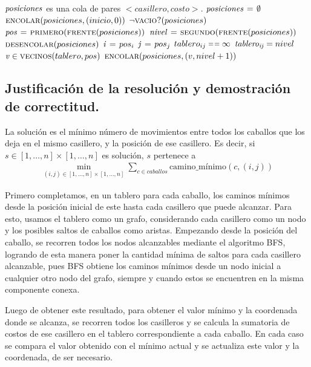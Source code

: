 \begin{codebox}
\li \Comment $\id{posiciones}$ es una cola de pares $<casillero, costo>$.
\li $\id{posiciones} \gets \emptyset$
\li $\textnormal{\scshape encolar}(posiciones, (inicio, 0))$
\li \While $\lnot \textnormal{\scshape vacio?}(posiciones)$ \Do
\li   $\id{pos} \gets \proc{primero}(\proc{frente}(posiciones))$
\li   $\id{nivel} \gets \proc{segundo}(\proc{frente}(posiciones))$
\li   $\textnormal{\scshape desencolar}(posiciones)$
\li   $\id{i} \gets pos_i$
\li   $\id{j} \gets pos_j$
\li   \If $tablero_{ij} \isequal \infty$ \Then
\li     $\id{tablero_{ij}} = nivel$
\li     \For $\id{v} \in \proc{vecinos}(tablero, pos)$ \Do
\li       $\textnormal{\scshape encolar}(posiciones, (v, nivel + 1))$
        \End
      \End
    \End	
\end{codebox}

\newpage
\subsection{Justificación de la resolución y demostración de correctitud.}

\vspace*{0.3cm}

La solución es el mínimo número de movimientos entre todos los caballos que
los deja en el mismo casillero, y la posición de ese casillero. Es decir, si
$s \in [1, \dots, n] \times [1, \dots, n]$ es solución, $s$ pertenece a
\begin{align*}
\min_{(i, j) \in [1, \dots, n] \times [1, \dots, n]} \sum_{c \in caballos}
\text{camino\_mínimo}(c, (i, j))
\end{align*}

Primero completamos, en un tablero para cada caballo, los caminos mínimos
desde la posición inicial de este hasta cada casillero que puede alcanzar.
Para esto, usamos el tablero como un grafo, considerando cada casillero como
un nodo y los posibles saltos de caballos como aristas. Empezando desde la
posición del caballo, se recorren todos los nodos alcanzables mediante el
algoritmo BFS, logrando de esta manera poner la cantidad mínima de saltos
para cada casillero alcanzable, pues BFS obtiene los caminos mínimos desde
un nodo inicial a cualquier otro nodo del grafo, siempre y cuando estos se
encuentren en la misma componente conexa.

Luego de obtener este resultado, para obtener el valor mínimo y la
coordenada donde se alcanza, se recorren todos los casilleros y se calcula
la sumatoria de costos de ese casillero en el tablero correspondiente a cada
caballo. En cada caso se compara el valor obtenido con el mínimo actual y se
actualiza este valor y la coordenada, de ser necesario.

